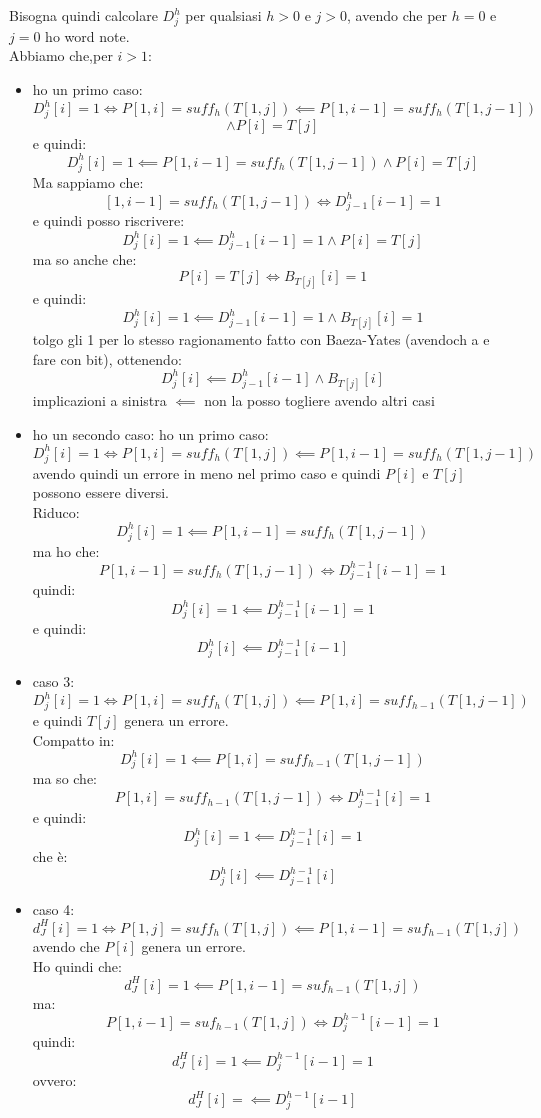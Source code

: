 Bisogna quindi calcolare $D_j^h$ per qualsiasi $h>0$ e $j>0$, avendo che per
$h=0$ e $j=0$ ho word note.\\
Abbiamo che,per $i>1$:
\begin{itemize}
  \item ho un primo caso:
  \[D_j^h[i]=1\iff P[1,i]=suff_h(T[1,j])\impliedby P[1,i-1] =
    suff_h(T[1,j-1])\]\[\land P[i] = T[j] \]
  e quindi:
  \[D_j^h[i]=1\impliedby P[1,i-1] = suff_h(T[1,j-1])\land P[i] = T[j] \]
  Ma sappiamo che:
  \[[1,i-1] = suff_h(T[1,j-1])\iff D_{j-1}^h[i-1]=1\]
  e quindi posso riscrivere:
  \[D_j^h[i]=1\impliedby D_{j-1}^h[i-1]=1\land P[i] = T[j] \]
  ma so anche che:
  \[P[i]=T[j]\iff B_{T[j]}[i] = 1\]
  e quindi:
  \[D_j^h[i]=1\impliedby D_{j-1}^h[i-1]=1\land B_{T[j]}[i] = 1\]
  tolgo gli 1 per lo stesso ragionamento fatto con Baeza-Yates (avendoch a e
  fare con bit), ottenendo:
  \[D_j^h[i]\impliedby D_{j-1}^h[i-1]\land B_{T[j]}[i]\]
  implicazioni a sinistra $\impliedby$ non la posso togliere avendo altri casi
  \item ho un secondo caso:
   ho un primo caso:
  \[D_j^h[i]=1\iff P[1,i]=suff_h(T[1,j])\impliedby P[1,i-1] =
    suff_h(T[1,j-1]) \]
  avendo quindi un errore in meno nel primo caso e quindi $P[i]$ e $T[j]$
  possono essere diversi.\\
  Riduco:
  \[D_j^h[i]=1\impliedby P[1,i-1] = suff_h(T[1,j-1]) \]
  ma ho che:
  \[P[1,i-1] = suff_h(T[1,j-1]) \iff D_{j-1}^{h-1}[i-1]=1\]
  quindi:
  \[D_j^h[i]=1\impliedby D_{j-1}^{h-1}[i-1]=1 \]
  e quindi:
  \[D_j^h[i]\impliedby D_{j-1}^{h-1}[i-1] \]
  \item caso 3:
  \[D^h_j[i] = 1 \iff P[1,i] = suff_h(T[1,j])\impliedby P[1,i] =
    suff_{h-1}(T[1,j-1])\]
  e quindi $T[j]$ genera un errore.\\
  Compatto in:
  \[D^h_j[i] = 1 \impliedby P[1,i] =    suff_{h-1}(T[1,j-1])\]
  ma so che:
  \[ P[1,i] = suff_{h-1}(T[1,j-1])\iff  D_{j-1}^{h-1}[i]=1\]
  e quindi:
  \[D^h_j[i] = 1 \impliedby D_{j-1}^{h-1}[i]=1\]
  che è:
  \[D^h_j[i]  \impliedby D_{j-1}^{h-1}[i]\]
  \item caso 4:
  \[d_J^H[i]=1\iff P[1,j]=suff_h(T[1,j])\impliedby P[1,i-1]=suf_{h-1}(T[1,j])\]
  avendo che $P[i]$ genera un errore.\\
  Ho quindi che:
  \[d_J^H[i]=1\impliedby P[1,i-1]=suf_{h-1}(T[1,j])\]
  ma:
  \[P[1,i-1]=suf_{h-1}(T[1,j])\iff D_j^{h-1}[i-1]=1\]
  quindi:
  \[d_J^H[i]=1\impliedby D_j^{h-1}[i-1]=1\]
  ovvero:
  \[d_J^H[i]=\impliedby D_j^{h-1}[i-1]\]

\end{itemize}
